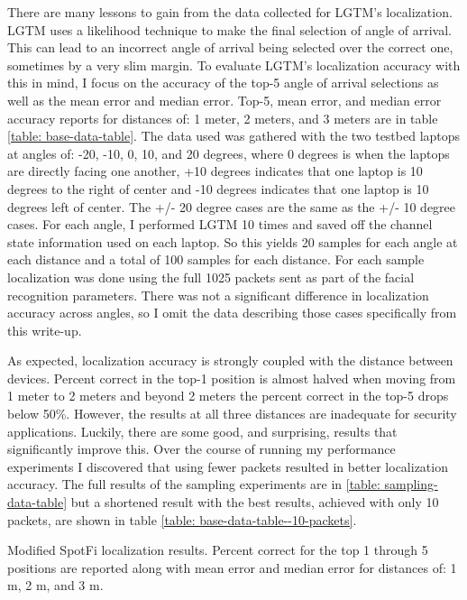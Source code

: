 \documentclass[12pt]{report}
\begin{document}
There are many lessons to gain from the data collected for LGTM's localization. LGTM uses a likelihood technique to make the final selection of angle of arrival. This can lead to an incorrect angle of arrival being selected over the correct one, sometimes by a very slim margin. To evaluate LGTM's localization accuracy with this in mind, I focus on the accuracy of the top-5 angle of arrival selections as well as the mean error and median error. Top-5, mean error, and median error accuracy reports for distances of: 1 meter, 2 meters, and 3 meters are in table \ref{table: base-data-table}. The data used was gathered with the two testbed laptops at angles of: -20, -10, 0, 10, and 20 degrees, where 0 degrees is when the laptops are directly facing one another, +10 degrees indicates that one laptop is 10 degrees to the right of center and -10 degrees indicates that one laptop is 10 degrees left of center. The +/- 20 degree cases are the same as the +/- 10 degree cases. For each angle, I performed LGTM 10 times and saved off the channel state information used on each laptop. So this yields 20 samples for each angle at each distance and a total of 100 samples for each distance. For each sample localization was done using the full 1025 packets sent as part of the facial recognition parameters. There was not a significant difference in localization accuracy across angles, so I omit the data describing those cases specifically from this write-up. \par 

As expected, localization accuracy is strongly coupled with the distance between devices. Percent correct in the top-1 position is almost halved when moving from 1 meter to 2 meters and beyond 2 meters the percent correct in the top-5 drops below 50\%. However, the results at all three distances are inadequate for security applications. Luckily, there are some good, and surprising, results that significantly improve this. Over the course of running my performance experiments I discovered that using fewer packets resulted in better localization accuracy. The full results of the sampling experiments are in \ref{table: sampling-data-table} but a shortened result with the best results, achieved with only 10 packets, are shown in table \ref{table: base-data-table--10-packets}. \par

\begin{table}
    \begin{center}
        \caption{Modified SpotFi localization results. Percent correct for the top 1 through 5 positions are reported along with mean error and median error for distances of: 1 m, 2 m, and 3 m.}
        \label{table: base-data-table--10-packets}
                
    \end{center}
\end{table}
\end{document}
